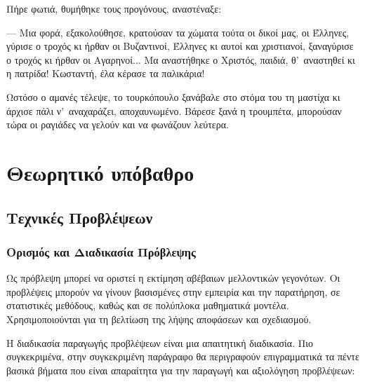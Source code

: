 \documentclass[diploma]{softlab-thesis}
\begin{document}
Πήρε φωτιά, θυμήθηκε τους προγόνους, αναστέναξε:

--- Μια φορά, εξακολούθησε, κρατούσαν τα χώματα τούτα οι δικοί μας, οι
Έλληνες, γύρισε ο τροχός κι ήρθαν οι Βυζαντινοί, Έλληνες κι αυτοί και
χριστιανοί, ξαναγύρισε ο τροχός κι ήρθαν οι Αγαρηνοί... Μα αναστήθηκε ο
Χριστός, παιδιά, θ’~αναστηθεί κι η πατρίδα! Κωσταντή, έλα κέρασε τα
παλικάρια!

Ωστόσο ο αμανές τέλεψε, το τουρκόπουλο ξανάβαλε στο στόμα του τη μαστίχα κι
άρχισε πάλι ν’~αναχαράζει, αποχαυνωμένο. Βάρεσε ξανά η τρουμπέτα, μπορούσαν
τώρα οι ραγιάδες να γελούν και να φωνάζουν λεύτερα.


\chapter{Θεωρητικό υπόβαθρο}

\section{Τεχνικές Προβλέψεων}

\subsection{Ορισμός και Διαδικασία Πρόβλεψης}

Ως πρόβλεψη μπορεί να οριστεί η εκτίμηση αβέβαιων μελλοντικών γεγονότων. Οι προβλέψεις μπορούν να γίνουν βασισμένες στην εμπειρία και την παρατήρηση, σε στατιστικές μεθόδους, καθώς και σε πολύπλοκα μαθηματικά μοντέλα. Χρησιμοποιούνται για τη βελτίωση της λήψης αποφάσεων και σχεδιασμού. 

Η διαδικασία παραγωγής προβλέψεων είναι μια απαιτητική διαδικασία. Πιο συγκεκριμένα, στην συγκεκριμένη παράγραφο θα περιγραφούν επιγραμματικά τα πέντε βασικά βήματα που είναι απαραίτητα για την παραγωγή και αξιολόγηση προβλέψεων:
\end{document}
